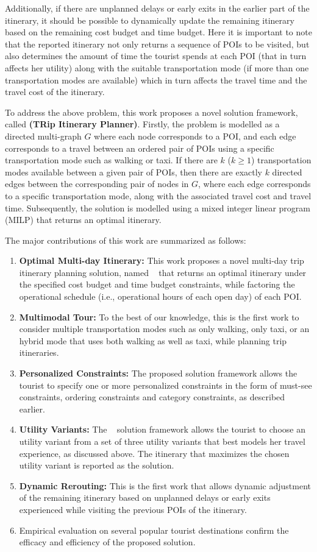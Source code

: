 Additionally, if there are unplanned delays or early exits in the earlier part of the itinerary, it should be possible to dynamically update the remaining itinerary based on the remaining cost budget and time budget. Here it is important to note that the reported itinerary not only returns a sequence of POIs to be visited, but also determines the amount of time the tourist spends at each POI (that in turn affects her utility) along with the suitable transportation mode (if more than one transportation modes are available) which in turn affects the travel time and the travel cost of the itinerary.

To address the above problem, this work proposes a novel solution framework,  called \textbf{\trip (TRip Itinerary Planner)}.  Firstly, the problem is modelled as a directed multi-graph $G$ where each node corresponds to a POI, and each edge corresponds to a travel between an ordered pair of POIs using a specific transportation mode such as walking or taxi. If there are $k$ ($k \ge 1$) transportation modes available between a given pair of POIs, then there are exactly $k$ directed edges between the corresponding pair of nodes in $G$, where each edge corresponds to a specific transportation mode, along with the associated travel cost and travel time. Subsequently, the solution is modelled using a mixed integer linear program (MILP) that returns an optimal itinerary.

The major contributions of this work are summarized as follows:
%
\begin{enumerate}
\item \textbf{Optimal Multi-day Itinerary:} This work proposes a novel multi-day trip itinerary planning solution, named \trip~ that returns an optimal itinerary under the specified cost budget and time budget constraints, while factoring the operational schedule (i.e., operational hours of each open day) of each POI.
\item \textbf{Multimodal Tour:} To the best of our knowledge, this is the first work to consider multiple transportation modes such as only walking, only taxi, or an hybrid mode that uses both walking as well as taxi, while planning trip itineraries.
\item \textbf{Personalized Constraints:} The proposed solution framework allows the tourist to specify one or more personalized constraints in the form of must-see constraints, ordering constraints and category constraints, as described earlier.
\item \textbf{Utility Variants:} The \trip~ solution framework allows the tourist to choose an utility variant from a set of three utility variants that best models her travel experience, as discussed above. The itinerary that maximizes the chosen utility variant is reported as the solution.
\item \textbf{Dynamic Rerouting:} This is the first work that allows dynamic adjustment of the remaining itinerary based on unplanned delays or early exits experienced while visiting the previous POIs of the itinerary.
\item Empirical evaluation on several popular tourist destinations confirm the efficacy and efficiency of the proposed solution. 
%
\end{enumerate}

